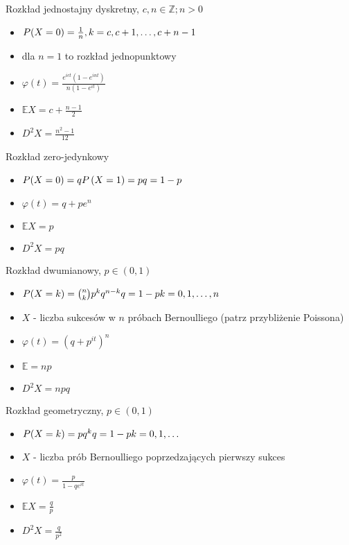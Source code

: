\documentclass[a4paper,12pt]{report}
\title{}
\author{Mariusz Motyl}
\theoremstyle{break}
\theoremstyle{definition}
\theoremstyle{defi}
\theoremstyle{break}
\theoremstyle{defi}
\begin{document}
{\Large Rozkład jednostajny dyskretny, $ c,n\in \mathbb Z;n>0 $}
\begin{multicols}{2}
\begin{itemize}
\item $ P(X=0) =\frac{1}{n},\\
k=c,c+1,\dots,c+n-1 $
\item dla $ n=1 $ to rozkład jednopunktowy
\item $ \varphi(t)=\frac{e^{ict}\left(1-e^{int}\right)}{n(1-e^{it})} $
\item $ \mathbb{E}X=c+\frac{n-1}{2} $
\item $ D^2X=\frac{n^2-1}{12} $
\end{itemize}
\end{multicols}
{\Large Rozkład zero-jedynkowy}
\begin{multicols}{2}
\begin{itemize}
\item $ P(X=0)=q\\
P\left(X=1\right)=p\\
q=1-p $
\item $ \varphi(t)=q+pe^n $
\item $ \mathbb{E}X=p $
\item $ D^2X=pq $
\end{itemize}
\end{multicols}
{\Large Rozkład dwumianowy, $ p\in\left(0,1\right) $}
\begin{multicols}{2}
\begin{itemize}
\item $ P(X=k)={n\choose k}p^kq^{n-k}\\
q=1-p\\
k=0,1,\dots,n$
\item $ X $ - liczba sukcesów w $ n $ próbach Bernoulliego (patrz przybliżenie Poissona)
\columnbreak
\item $ \varphi(t)=\left(q+p^{it}\right)^n $
\item $ \mathbb{E}=np $
\item $ D^2X=npq $
\end{itemize}
\end{multicols}
{\Large Rozkład geometryczny, $ p\in\left(0,1\right) $}
\begin{multicols}{2}
\begin{itemize}
\item $ P(X=k)=pq^k\\
q=1-p\\
k=0,1,\dots $
\item $ X $ - liczba prób Bernoulliego poprzedzających pierwszy sukces\\
\item $ \varphi(t)=\frac{p}{1-qe^{it}} $\\
\item $ \mathbb{E}X=\frac{q}{p} $\\
\item $ D^2X=\frac{q}{p^2} $
\end{itemize}
\end{multicols}
\end{document}
